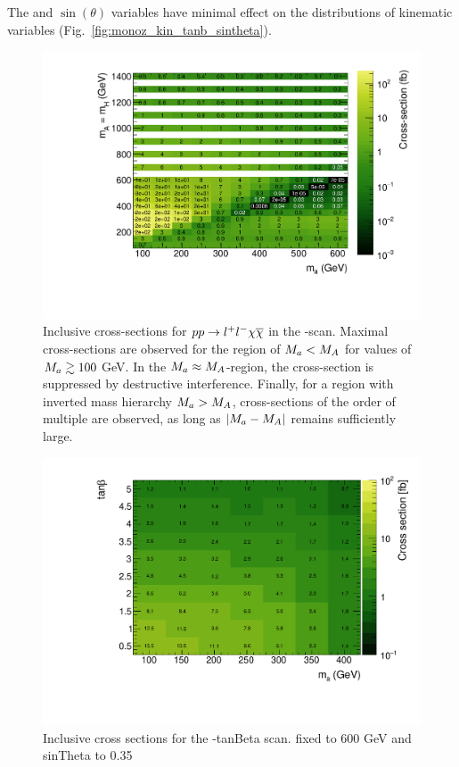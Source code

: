 The \tanb and $\sin(\theta)$ variables have minimal effect on the distributions of kinematic variables (Fig.~\ref{fig:monoz_kin_tanb_sintheta}).


\begin{figure}
\centering
\includegraphics[width=\textwidth]{texinputs/04_grid/figures/monoz/leptonic/xs_2d_inclusive_26300.pdf}
\caption{Inclusive cross-sections for $pp\rightarrow l^{+}l^{-}\chi\overline{\chi}$ in the \ma-\mA scan. Maximal cross-sections are observed for the region of $M_{a} < M_{A}$ for values of $M_{a}\gtrsim100$ GeV.  In the $M_{a}\approx M_{A}$-region, the cross-section is suppressed by destructive interference. Finally, for a region with inverted mass hierarchy $M_{a}>M_{A}$, cross-sections of the order of multiple \ifb are observed, as long as $|M_{a}-M_{A}|$ remains sufficiently large.}
\end{figure}


\begin{figure}
\centering
\includegraphics[width=\textwidth]{texinputs/04_grid/figures/monoz/leptonic/tanbma_xsec_ll.pdf}
\caption{Inclusive cross sections for the \ma-tanBeta scan.  \mA fixed to 600 GeV and sinTheta to 0.35} 
\end{figure}


